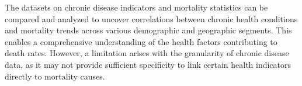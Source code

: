 \documentclass[a4paper,10pt]{article}
\begin{document}
The datasets on chronic disease indicators and mortality statistics can be compared and analyzed to uncover correlations between chronic health conditions and mortality trends across various demographic and geographic segments. This enables a comprehensive understanding of the health factors contributing to death rates. However, a limitation arises with the granularity of chronic disease data, as it may not provide sufficient specificity to link certain health indicators directly to mortality causes.



\newpage


\end{document}
